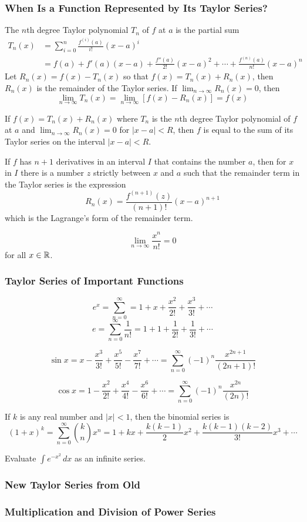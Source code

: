 \subsubsection*{When Is a Function Represented by Its Taylor Series?}
The \(n\)th degree Taylor polynomial \(T_n\) of \(f\) at \(a\) is the partial
sum
\begin{align*}
    T_n(x) &= \sum_{i=0}^{n}\frac{f^{(i)}(a)}{i!}(x-a)^i \\
    &= f(a)+f'(a)(x-a)+\frac{f''(a)}{2!}(x-a)^2+\cdots
    +\frac{f^{(n)}(a)}{n!}(x-a)^n
\end{align*}
Let \(R_n(x)=f(x)-T_n(x)\) so that \(f(x)=T_n(x)+R_n(x)\), then \(R_n(x)\) is
the remainder of the Taylor series.
If \(\lim_{n\to\infty}R_n(x)=0\), then
\[\lim_{n\to\infty}T_n(x)=\lim_{n\to\infty}[f(x)-R_n(x)]=f(x)\]
\begin{theorem}
    If \(f(x)=T_n(x)+R_n(x)\) where \(T_n\) is the \(n\)th degree Taylor
    polynomial of \(f\) at \(a\) and \(\lim_{n\to\infty}R_n(x)=0\) for
    \(|x-a|<R\), then \(f\) is equal to the sum of its Taylor series on the
    interval \(|x-a|<R\).
\end{theorem}
\begin{theorem}
    If \(f\) has \(n+1\) derivatives in an interval \(I\) that contains the
    number \(a\), then for \(x\) in \(I\) there is a number \(z\) strictly
    between \(x\) and \(a\) such that the remainder term in the Taylor series
    is the expression
    \[R_n(x)=\frac{f^{(n+1)}(z)}{(n+1)!}(x-a)^{n+1}\]
    which is the Lagrange's form of the remainder term.
\end{theorem}
\[\lim_{n\to\infty}\frac{x^n}{n!}=0\] for all \(x\in\mathbb{R}\).

\subsubsection*{Taylor Series of Important Functions}
\[e^x=\sum_{n=0}^\infty=1+x+\frac{x^2}{2!}+\frac{x^3}{3!}+\cdots\]
\[e=\sum_{n=0}^\infty\frac{1}{n!}=1+1+\frac{1}{2!}+\frac{1}{3!}+\cdots\]

\[\sin x=x-\frac{x^3}{3!}+\frac{x^5}{5!}-\frac{x^7}{7!}+\cdots
=\sum_{n=0}^\infty(-1)^n\frac{x^{2n+1}}{(2n+1)!}\]

\[\cos x=1-\frac{x^2}{2!}+\frac{x^4}{4!}-\frac{x^6}{6!}+\cdots
=\sum_{n=0}^\infty(-1)^n\frac{x^{2n}}{(2n)!}\]

If \(k\) is any real number and \(|x|<1\), then the binomial series is
\[(1+x)^k=\sum_{n=0}^\infty\binom{k}{n}x^n=1+kx+\frac{k(k-1)}{2}x^2
+\frac{k(k-1)(k-2)}{3!}x^3+\cdots\]
\begin{problem}
    Evaluate \(\displaystyle{\int e^{-x^2}}\,dx\) as an infinite series.
\end{problem}

\subsubsection*{New Taylor Series from Old}

\subsubsection*{Multiplication and Division of Power Series}